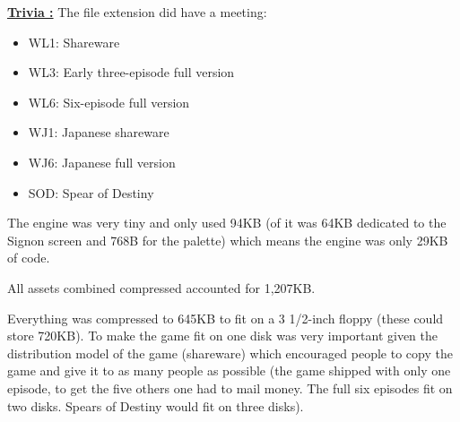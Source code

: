 \documentclass[book.tex]{subfiles}
\begin{document}
\textbf{\underline{Trivia :}} The file extension did have a meeting: 
\begin{itemize}
\item WL1: Shareware
\item WL3: Early three-episode full version
\item WL6: Six-episode full version
\item WJ1: Japanese shareware
\item WJ6: Japanese full version
\item SOD: Spear of Destiny
\end{itemize}
 
\par
 The engine was very tiny and only used 94KB (of it was 64KB dedicated to the Signon screen and 768B for the palette) which means the engine was only 29KB of code.\\
 \par
 All assets combined compressed accounted for 1,207KB.\\
 \par
 Everything was compressed to 645KB to fit on a 3 1/2-inch floppy (these could store 720KB). To make the game fit on one disk was very important given the distribution model
 of the game (shareware) which encouraged people to copy the game and give it to as many people as possible (the game shipped with only one episode, to get the five others
 one had to mail money. The full six episodes fit on two disks. Spears of Destiny would fit on three disks).
\end{document}
